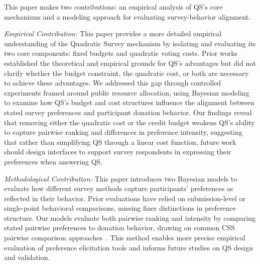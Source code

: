 This paper makes two contributions: an empirical analysis of QS's core mechanisms and a modeling approach for evaluating survey-behavior alignment.

\textit{Empirical Contribution: } This paper provides a more detailed empirical understanding of the Quadratic Survey mechanism by isolating and evaluating its two core components: fixed budgets and quadratic voting costs. Prior works~\cite{georgescuFixedbudgetMultipleissueQuadratic2024, eguia2019quadratic, quarfoot2017quadratic, chengCanShowWhat2021} established the theoretical and empirical grounds for QS's advantages but did not clarify whether the budget constraint, the quadratic cost, or both are necessary to achieve these advantages. We addressed this gap through controlled experiments framed around public resource allocation, using Bayesian modeling to examine how QS's budget and cost structures influence the alignment between stated survey preferences and participant donation behavior. Our findings reveal that removing either the quadratic cost or the credit budget weakens QS's ability to capture pairwise ranking and differences in preference intensity, suggesting that rather than simplifying QS through a linear cost function, future work should design interfaces to support survey respondents in expressing their preferences when answering QS.

\textit{Methodological Contribution:} This paper introduces two Bayesian models to evaluate how different survey methods capture participants' preferences as reflected in their behavior. Prior evaluations have relied on submission-level or single-point behavioral comparisons, missing finer distinctions in preference structure. Our models evaluate both pairwise ranking and intensity by comparing stated pairwise preferences to donation behavior, drawing on common CSS pairwise comparison approaches~\cite{collewet2023preference, hauserIntensityMeasuresConsumer1980a}. This method enables more precise empirical evaluation of preference elicitation tools and informs future studies on QS design and validation.




